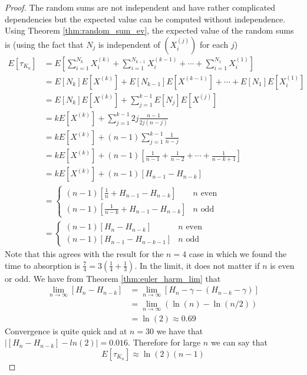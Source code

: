 \begin{proof}
The random sums are not independent and have rather complicated dependencies but the expected value can be computed without independence.
Using Theorem \ref{thm:random_sum_ev}, the expected value of the random sums is (using the fact that $N_j$ is independent of $(X_i^{(j)})$ for each $j$)
\begin{align*}
    E[\tau_{K_n}] &= E\left[\sum_{i = 1}^{N_k} X_i^{(k)} + \sum_{i = 1}^{N_{k - 1}} X_i^{(k - 1)} + \cdots + \sum_{i = 1}^{N_1} X_i^{(1)}\right]\\
    &= E[N_k] E[X^{(k)}] + E[N_{k - 1}] E[X^{(k - 1)}] + \cdots + E[N_1]E[X_i^{(1)}]\\
    &= E[N_k] E[X^{(k)}] + \sum_{j = 1}^{k - 1} E[N_j]E[X^{(j)}]\\
    &= k E[X^{(k)}] + \sum_{j = 1}^{k - 1} 2j \frac{n - 1}{2j (n - j)} \\
    &= k E[X^{(k)}] + (n - 1) \sum_{j = 1}^{k - 1} \frac{1}{n - j}\\
    &= k E[X^{(k)}] + (n - 1) \left[ \frac{1}{n - 1} + \frac{1}{n - 2} + \cdots + \frac{1}{n - k + 1} \right]\\
    &= k E[X^{(k)}] + (n - 1) \left[ H_{n - 1} - H_{n - k} \right]\\
    &= \begin{cases}
    (n - 1) \left[\frac{1}{n} + H_{n - 1} - H_{n - k}\right] & n \text{ even}\\
    (n - 1) \left[\frac{1}{n - k} + H_{n - 1} - H_{n - k}\right] & n \text{ odd}
    \end{cases}\\
    &= \begin{cases}
    (n - 1) \left[H_{n} - H_{n - k}\right] & n \text{ even}\\
    (n - 1) \left[H_{n - 1} - H_{n - k - 1}\right] & n \text{ odd}
\end{cases}
\end{align*}
Note that this agrees with the result for the $n = 4$ case in which we found the time to absorption is $\frac{7}{4} = 3 (\frac{1}{4} + \frac{1}{3})$.
In the limit, it does not matter if $n$ is even or odd.
We have from Theorem \ref{thm:euler_harm_lim} that
\begin{align*}
    \lim_{n \to \infty} [H_{n} - H_{n - k}] &=  \lim_{n \to \infty} [H_{n} - \gamma - (H_{n - k} - \gamma)]\\
    &= \lim_{n \to \infty} (\ln(n) - \ln(n/2))\\
    &= \ln(2) \approx 0.69
\end{align*}
Convergence is quite quick and at $n = 30$ we have that $|[H_{n} - H_{n - k}] - ln(2)| = 0.016$.
Therefore for large $n$ we can say that
$$
E[\tau_{K_n}] \approx \ln(2) (n - 1)
$$
\end{proof}

